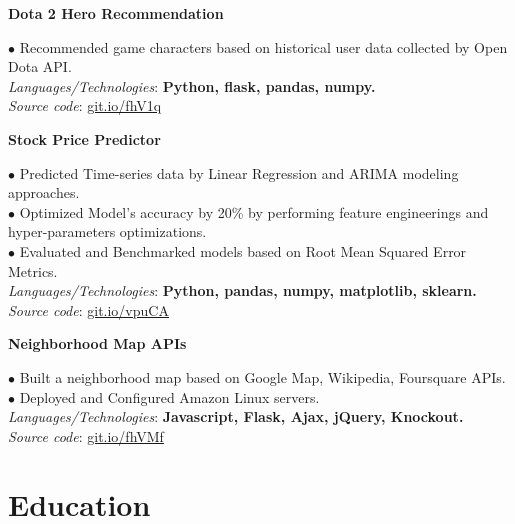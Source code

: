 \documentclass[10pt]{article}
\begin{document}
        \begin{center}
            \textbf{Dota 2 Hero Recommendation}
        \end{center}
        $\bullet$ {Recommended game characters based on historical user data collected by Open Dota API.} \\
        \emph{Languages/Technologies}: \textbf{Python, flask, pandas, numpy.} \\
        \emph{Source code}: \href{https://git.io/fhV1q}{git.io/fhV1q}


        \begin{center}
            \textbf{Stock Price Predictor}
        \end{center}
        $\bullet$ {Predicted Time-series data by Linear Regression and ARIMA modeling approaches.} \\
        $\bullet$ {Optimized Model's accuracy by 20\% by performing feature engineerings and hyper-parameters optimizations.} \\
        $\bullet$ {Evaluated and Benchmarked models based on Root Mean Squared Error Metrics.} \\
        \emph{Languages/Technologies}: \textbf{Python, pandas, numpy, matplotlib, sklearn.} \\
        \emph{Source code}: \href{https://git.io/vpuCA}{git.io/vpuCA}


        \begin{center}
            \textbf{Neighborhood Map APIs}
        \end{center}
        $\bullet$ {Built a neighborhood map based on Google Map, Wikipedia, Foursquare APIs.} \\
        $\bullet$ {Deployed and Configured Amazon Linux servers.} \\
        \emph{Languages/Technologies}: \textbf{Javascript, Flask, Ajax, jQuery, Knockout.} \\
        \emph{Source code}: \href{https://git.io/fhVMf}{git.io/fhVMf}


    \section{Education}
        \vspace{-5mm}
\end{document}
